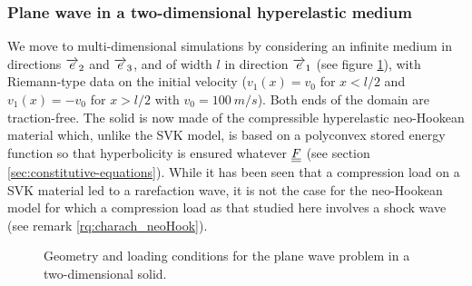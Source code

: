 

\subsubsection*{Plane wave in a two-dimensional hyperelastic medium}
We move to multi-dimensional simulations by considering an infinite medium in directions ${\overrightarrow{e}}_2$ and ${\overrightarrow{e}}_3$, and of width $l$ in direction ${\overrightarrow{e}}_1$ (see figure \ref{fig:2dHEbar}), with Riemann-type data on the initial velocity ($v_1(x)=v_0$ for $x <l/2$ and $v_1(x)=-v_0$ for $x >l/2$ with $v_0=100 \: m/s$). Both ends of the domain are traction-free.
The solid is now made of the compressible hyperelastic neo-Hookean material which, unlike the SVK model, is based on a polyconvex stored energy function so that hyperbolicity is ensured whatever ${\underline{\underline{F}}}$ (see section \ref{sec:constitutive-equations}).
While it has been seen that a compression load on a SVK material led to a rarefaction wave, it is not the case for the neo-Hookean model for which a compression load as that studied here involves a shock wave (see remark \ref{rq:charach_neoHook}).
\begin{figure}[h!]
  \centering
  
  \caption{Geometry and loading conditions for the plane wave problem in a two-dimensional solid.}
  \label{fig:2dHEbar}
\end{figure}

